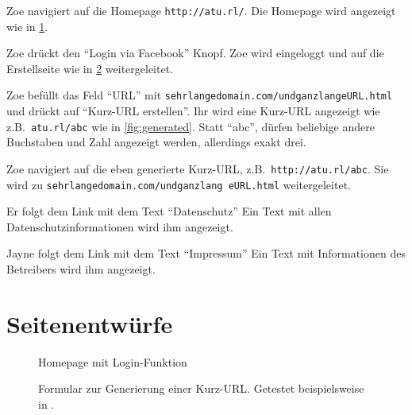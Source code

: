 \documentclass[parskip=full,11pt,twoside]{scrartcl}
\begin{document}
{Zoe navigiert auf die Homepage \texttt{http://atu.rl/}.}
{Die Homepage wird angezeigt wie in \cref{fig:homepage}.}

%
{Zoe drückt den \enquote{Login via Facebook} Knopf.}%
{Zoe wird eingeloggt und auf die Erstellseite wie in \cref{fig:form} weitergeleitet.}

\teststep{}
{Zoe befüllt das Feld \enquote{URL} mit \texttt{sehrlangedomain.com/undganzlangeURL.html} und drückt auf \enquote{Kurz-URL erstellen}.}%
{Ihr wird eine Kurz-URL angezeigt wie z.B.\ \texttt{atu.rl/abc}
 wie in \cref{fig:generated}.
 Statt \enquote{abc}, dürfen beliebige andere Buchstaben und Zahl angezeigt werden, allerdings exakt drei.}

\teststep{}
{Zoe navigiert auf die eben generierte Kurz-URL, z.B.\ \texttt{http://atu.rl/abc}.}
{Sie wird zu \texttt{sehrlangedomain.com/undganzlang  eURL.html} weitergeleitet.}


{Er folgt dem Link mit dem Text \enquote{Datenschutz}}
{Ein Text mit allen Datenschutzinformationen wird ihm angezeigt.}

\teststep{}
{Jayne folgt dem Link mit dem Text \enquote{Impressum}}
{Ein Text mit Informationen des Betreibers wird ihm angezeigt.}

\pagebreak
\appendix

\section{Seitenentwürfe}


\begin{figure}[hb]
\caption{\label{fig:homepage}
Homepage mit Login-Funktion
}
\end{figure}

\begin{figure}[hb]
\caption{\label{fig:form}
Formular zur Generierung einer Kurz-URL.
Getestet beispielsweise in .
}
\end{figure}
\end{document}
